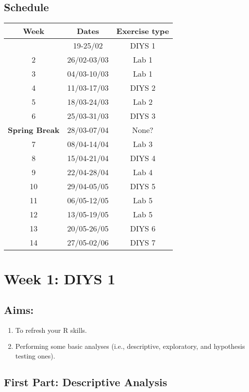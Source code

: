 \documentclass[
]{book}
\providecommand{\tightlist}{%
  \setlength{\itemsep}{0pt}\setlength{\parskip}{0pt}}
\begin{document}
\hypertarget{schedule}{%
\section{Schedule}\label{schedule}}

\begin{longtable}[]{@{}ccc@{}}
\toprule\noalign{}
Week & Dates & Exercise type \\
\midrule\noalign{}
\endhead
\bottomrule\noalign{}
\endlastfoot
1 & 19-25/02 & DIYS 1 \\
2 & 26/02-03/03 & Lab 1 \\
3 & 04/03-10/03 & Lab 1 \\
4 & 11/03-17/03 & DIYS 2 \\
5 & 18/03-24/03 & Lab 2 \\
6 & 25/03-31/03 & DIYS 3 \\
\textbf{Spring Break} & 28/03-07/04 & None? \\
7 & 08/04-14/04 & Lab 3 \\
8 & 15/04-21/04 & DIYS 4 \\
9 & 22/04-28/04 & Lab 4 \\
10 & 29/04-05/05 & DIYS 5 \\
11 & 06/05-12/05 & Lab 5 \\
12 & 13/05-19/05 & Lab 5 \\
13 & 20/05-26/05 & DIYS 6 \\
14 & 27/05-02/06 & DIYS 7 \\
\end{longtable}

\hypertarget{week-1-diys-1}{%
\chapter{Week 1: DIYS 1}\label{week-1-diys-1}}

\hypertarget{aims}{%
\section{Aims:}\label{aims}}

\begin{enumerate}
\def\labelenumi{\arabic{enumi}.}
\tightlist
\item
  To refresh your R skills.
\item
  Performing some basic analyses (i.e., descriptive, exploratory, and hypothesis testing ones).
\end{enumerate}

\hypertarget{first-part-descriptive-analysis}{%
\section{First Part: Descriptive Analysis}\label{first-part-descriptive-analysis}}
\end{document}
